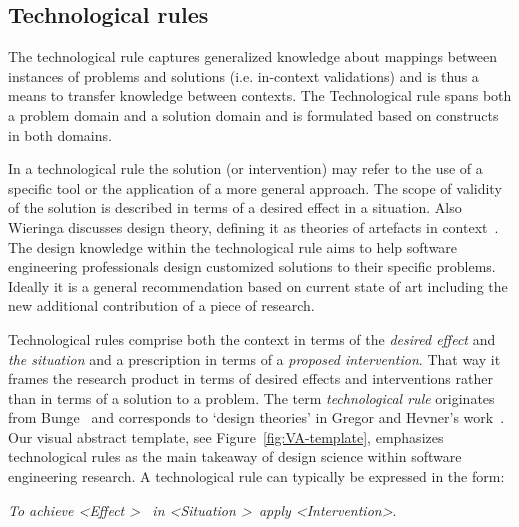 \documentclass[graybox]{svmult}
\begin{document}
\subsection{Technological rules}
\label{sec:technologicalrules}



The technological rule captures generalized knowledge about mappings between instances of problems and solutions (i.e. in-context validations) and is thus a means to transfer knowledge between contexts. The Technological rule spans both a problem domain and a solution domain and is formulated based on constructs in both domains. 

In a technological rule the solution (or intervention) may refer to the use of a specific tool or the application of a more general approach. The scope of validity of the solution is described in terms of a desired effect in a situation.  Also Wieringa discusses design theory, defining it as theories of artefacts in context~\cite{wieringa_design_2009}. The design knowledge within the technological rule aims to help software engineering professionals design customized solutions to their specific problems. Ideally it is a general recommendation based on current state of art including the new additional contribution of a piece of research.

Technological rules comprise both the context in terms of the \emph{desired effect} and \emph{the situation} and a prescription in terms of a \emph{proposed intervention}. That way it frames the research product in terms of desired effects and interventions rather than in terms of a solution to a problem. The term \emph{technological rule} originates from Bunge~\cite{bunge_philosophy_1998} and corresponds to `design theories' in Gregor and Hevner's work~\cite{gregor_positioning_2013}. Our visual abstract template,  see Figure~\ref{fig:VA-template}, emphasizes technological rules as the main takeaway of design science within software engineering research. A technological rule can typically be expressed in the form: 

\begin{center}{\emph{To achieve \textless Effect \textgreater ~ in \textless Situation \textgreater~apply \textless Intervention\textgreater}.} 
\newline
\end{center}
\end{document}
